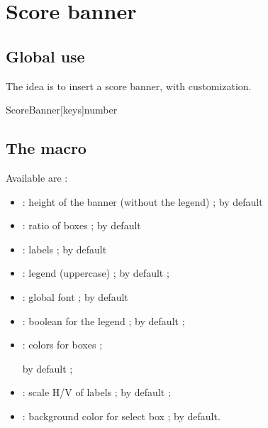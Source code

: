 \documentclass[english,11pt,a4paper]{article}
\begin{document}
\pagebreak

\section{Score banner}

\subsection{Global use}

The idea is to insert a score banner, with customization.

\begin{codehigh}[language=latex/latex3,style/main=teal!25,style/code=teal!25]
ScoreBanner[keys]{number}
\end{codehigh}

\begin{demohigh}[language=latex/latex3,style/main=teal!25,style/code=teal!25]
\ScoreBanner{}
\end{demohigh}

\subsection{The macro}

Available  are :

\begin{itemize}
	\item {} : height of the banner (without the legend) ;  by default
	\item {} : ratio of boxes ;  by default
	\item {} : labels ;  by default
	\item {} : legend (uppercase) ;  by default ;
	\item {} : global font ;  by default
	\item {} : boolean for the legend ;   by default ;
	\item {} : colors for boxes ;
	
	\hfill{} by default ;
	\item {} : scale H/V of labels ;   by default ;
	\item {} : background color for select box  ;   by default.
\end{itemize}
\end{document}
